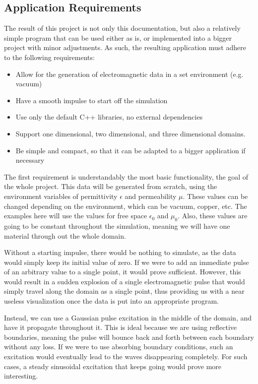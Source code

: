 \subsection{Application Requirements}

The result of this project is not only this documentation, but also a relatively simple program that can be used either as is, or implemented into a bigger project with minor adjustments. As such, the resulting application must adhere to the following requirements:

\begin{itemize}
	\item Allow for the generation of electromagnetic data in a set environment (e.g. vacuum)
	\item Have a smooth impulse to start off the simulation
	\item Use only the default C++ libraries, no external dependencies
	\item Support one dimensional, two dimensional, and three dimensional domains.
	\item Be simple and compact, so that it can be adapted to a bigger application if necessary
\end{itemize}

The first requirement is understandably the most basic functionality, the goal of the whole project. This data will be generated from scratch, using the environment variables of permittivity $\epsilon$ and permeability $\mu$. These values can be changed depending on the environment, which can be vacuum, copper, etc. The examples here will use the values for free space $\epsilon_{0}$ and $\mu_{0}$. Also, these values are going to be constant throughout the simulation, meaning we will have one material through out the whole domain. 

Without a starting impulse, there would be nothing to simulate, as the data would simply keep its initial value of zero. If we were to add an immediate pulse of an arbitrary value to a single point, it would prove sufficient. However, this would result in a sudden explosion of a single electromagnetic pulse that would simply travel along the domain as a single point, thus providing us with a near useless visualization once the data is put into an appropriate program. 

Instead, we can use a Gaussian pulse excitation in the middle of the domain, and have it propagate throughout it. This is ideal because we are using reflective boundaries, meaning the pulse will bounce back and forth between each boundary without any loss. If we were to use absorbing boundary conditions, such an excitation would eventually lead to the waves disappearing completely. For such cases, a steady sinusoidal excitation that keeps going would prove more interesting.


